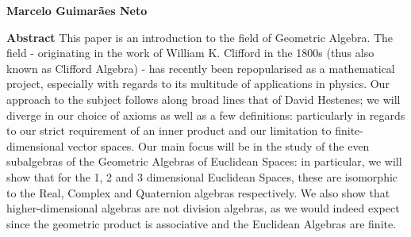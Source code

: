 \thispagestyle{plain}
\begin{center}
    \Large
    \textbf{\thtitle}
        
    \vspace{0.4cm}
    \large
	\thsubtitle

    \vspace{0.4cm}
    \textbf{Marcelo Guimarães Neto}
       
    \vspace{0.9cm}
    \textbf{Abstract}
	This paper is an introduction to the field of Geometric Algebra. The field - originating in the work of William K. Clifford in the 1800s (thus also known as Clifford Algebra) - has recently been repopularised as a mathematical project, especially with regards to its multitude of applications in physics. Our approach to the subject follows along broad lines that of David Hestenes; we will diverge in our choice of axioms as well as a few definitions: particularly in regards to our strict requirement of an inner product and our limitation to finite-dimensional vector spaces. Our main focus will be in the study of the even subalgebras of the Geometric Algebras of Euclidean Spaces: in particular, we will show that for the 1, 2 and 3 dimensional Euclidean Spaces, these are isomorphic to the Real, Complex and Quaternion algebras respectively. We also show that higher-dimensional algebras are not division algebras, as we would indeed expect since the geometric product is associative and the Euclidean Algebras are finite.
\end{center}
